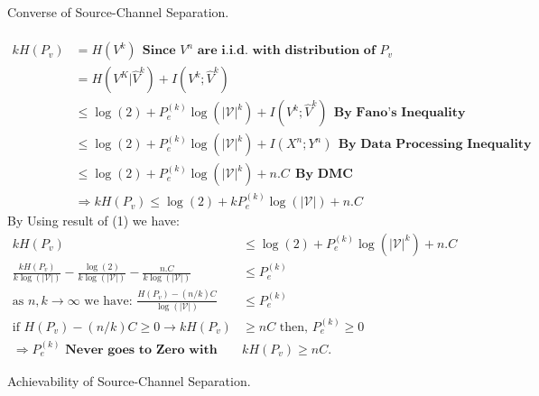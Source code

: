 \documentclass[
  course = {{EE623 Information Theory}},
  quartile = {{4}},
  assignment = 9,
  name = {{Mohammad Mahdi Rahimi}},
  studentnumber = {{20208244}},
  email = {{mahi@kaist.ac.kr}},
  firstexercise = 1
]{aga-homework}
\begin{document}
\exercise
\subexercise Converse of Source-Channel Separation.
\\\\
\begin{equation} \label{eq1}
\begin{split}
kH(P_v) & = H(V^k)\ \ \textbf{Since $V^n$ are i.i.d. with distribution of $P_v$}\\
& = H(V^K|\hat{V}^k) + I(V^k;\hat{V}^k)\\
& \le \log(2) + P^{(k)}_e \log(|\mathcal{V}|^k) + I(V^k;\hat{V}^k)\ \ \textbf{By Fano's Inequality} \\
& \le \log(2) + P^{(k)}_e \log(|\mathcal{V}|^k) + I(X^n;Y^n)\ \ \textbf{By Data Processing Inequality} \\
& \le \log(2) + P^{(k)}_e \log(|\mathcal{V}|^k) + n.C\ \ \textbf{By DMC} \\
& \Rightarrow kH(P_v) \le  \log(2) + kP^{(k)}_e \log(|\mathcal{V}|) + n.C
\end{split}
\end{equation}
By Using result of (1) we have:
\begin{equation} \label{eq2}
\begin{split}
kH(P_v) &\le \log(2) + P^{(k)}_e \log(|\mathcal{V}|^k) + n.C \\
\frac{kH(P_v)}{k\log(|\mathcal{V}|)} - \frac{\log(2)}{k\log(|\mathcal{V}|)} - \frac{n.C}{k\log(|\mathcal{V}|)} & \le P^{(k)}_e \\
\text{as $n, k \rightarrow \infty$ we have: }  \frac{H(P_v) - (n/k)C}{\log(|\mathcal{V}|)} & \le P^{(k)}_e \\
\text{if } H(P_v) - (n/k)C \ge 0 \rightarrow kH(P_v)& \ge nC \text{ then, } P^{(k)}_e \ge 0 \\
\Rightarrow P^{(k)}_e\textbf{ Never goes to Zero with }& kH(P_v) \ge nC.
\end{split}
\end{equation}

\subexercise Achievability of Source-Channel Separation.
\\\\
\end{document}
